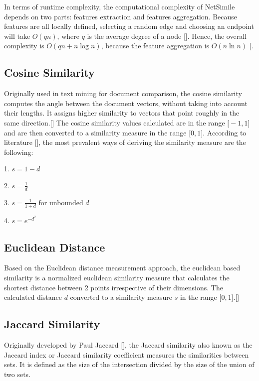 In terms of runtime complexity, the computational complexity of NetSimile depends on two parts: features extraction and features aggregation. Because features are all locally defined, selecting a random edge and choosing an endpoint will take $O(q n)$, where $q$ is the average degree of a node [\cite{Henderson:2011}]. Hence, the overall complexity is $O(q n+n \log n)$, because the feature aggregation is $O(n \ln n)$ [\cite{Berlingerio:2012, Tsitsulin:2018}.

\subsection{Cosine Similarity}
Originally used in text mining for document comparison, the cosine similarity computes the angle between the document vectors, without taking into account their lengths. It assigns higher similarity to vectors that point roughly in the same direction.[\cite{scikit-learn}]
The cosine similarity values calculated are in the range $\mathrm[-1, 1]$ and are then converted to a similarity measure in the range $\mathrm[0, 1]$. According to literature [\cite{Han:2012}], the most prevalent ways of deriving the similarity measure are the following:

1. $s=1-d$

2. $s=\frac{1}{d}$

3. $s=\frac{1}{1+d}$ for unbounded $d$

4. $s=e^{-d^{2}}$

\subsection{Euclidean Distance}
Based on the Euclidean distance measurement approach, the euclidean based similarity  is a normalized euclidean similarity measure that calculates the shortest distance between 2 points irrespective of their dimensions.  The calculated distance $d$ converted to a similarity measure $s$ in the range $\mathrm[0, 1]$.[\cite{scikit-learn}]

\subsection{Jaccard Similarity}
Originally developed by Paul Jaccard [\cite{Jaccard:1901}], the Jaccard similarity also known as the Jaccard index or Jaccard similarity coefficient measures the similarities between sets. It is defined as the size of the intersection divided by the size of the union of two sets.

